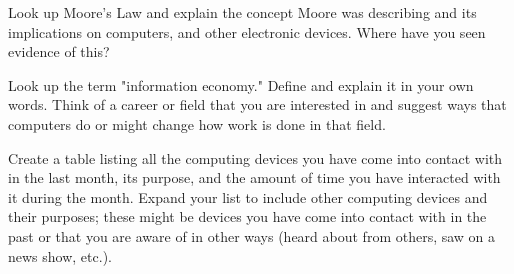 \begin{ex}
	Look up Moore's Law and explain the concept Moore was describing and its implications on computers, and other electronic devices. Where have you seen evidence of this?	
\end{ex}
\begin{ex}
	Look up the term "information economy." Define and explain it in your own words. Think of a career or field that you are interested in and suggest ways that computers do or might change how work is done in that field.
\end{ex}
\begin{ex}
	Create a table listing all the computing devices you have come into contact with in the last month, its purpose, and the amount of time you have interacted with it during the month. Expand your list to include other computing devices and their purposes; these might be devices you have come into contact with in the past or that you are aware of in other ways (heard about from others, saw on a news show, etc.).
\end{ex}
